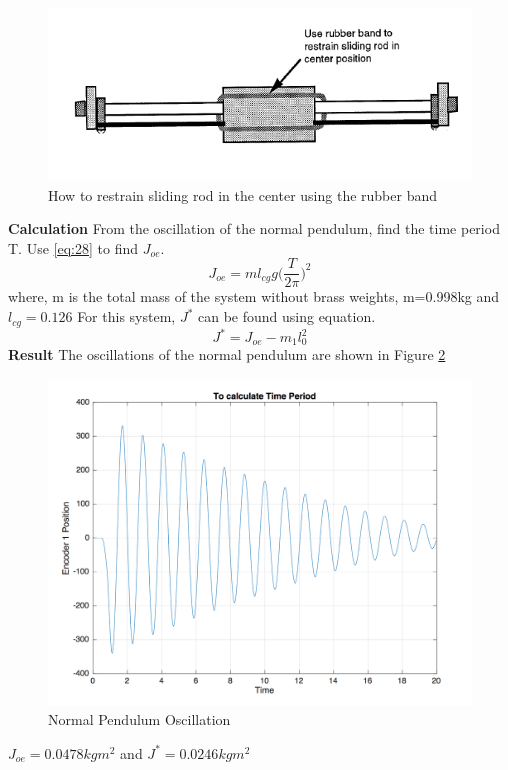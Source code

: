 \documentclass[12pt, a4paper]{article}
\begin{document}
\begin{figure}[H]
\centering
\includegraphics[width = \textwidth]{rubberband.png}
\caption{How to restrain sliding rod in the center using the rubber band}
\label{Fig8}
\end{figure}
\textbf{Calculation} From the oscillation of the normal pendulum, find the time period T. Use \eqref{eq:28} to find $J_{oe}$.
\begin{equation}\label{eq:28}
J_{oe} = ml_{cg}g\Bigg(\frac{T}{2\pi}\Bigg)^2
\end{equation}
where, m is the total mass of the system without brass weights,  m=0.998kg and $l_{cg} = 0.126$ For this system, $J^*$ can be found using equation.
\begin{equation}\label{eq:29}
J^* = J_{oe} - m_1l_0^2
\end{equation}
\textbf{Result} The oscillations of the normal pendulum are shown in Figure \ref{Fig9}
\begin{figure}[H]
\centering
\includegraphics[width = \textwidth]{time.png}
\caption{Normal Pendulum Oscillation}
\label{Fig9}
\end{figure}
$J_{oe} = 0.0478kgm^2$ and $J^* =  0.0246kgm^2$
\end{document}
